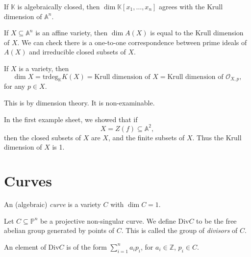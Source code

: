 \documentclass[12pt]{article}
\begin{document}

\begin{remark}
	If $\mathbb{K}$ is algebraically closed, then $\dim \mathbb{K}[x_1, \ldots, x_n]$ agrees with the Krull dimension of $\mathbb{A}^n$.

	If $X \subseteq \mathbb{A}^n$ is an affine variety, then $\dim A(X)$ is equal to the Krull dimension of $X$. We can check there is a one-to-one correspondence between prime ideals of $A(X)$ and irreducible closed subsets of $X$.
\end{remark}

\begin{theorem}
	If $X$ is a variety, then
	\[
		\dim X = \mathrm{trdeg}_{\mathbb{K}} K(X) = \text{Krull dimension of } X = \text{Krull dimension of } \mathcal{O}_{X, p},
	\]
	for any $p \in X$.
\end{theorem}

\begin{proofbox}
	This is by dimension theory. It is non-examinable.
\end{proofbox}

\begin{exbox}
	In the first example sheet, we showed that if
	\[
	X = Z(f) \subseteq \mathbb{A}^2,
	\]
	then the closed subsets of $X$ are $X$, and the finite subsets of $X$. Thus the Krull dimension of $X$ is 1.
\end{exbox}

\newpage

\section{Curves}
\label{sec:c}

\begin{definition}
	An (algebraic) \emph{curve} is a variety $C$ with $\dim C = 1$.
\end{definition}

\begin{definition}
	Let $C \subseteq \mathbb{P}^n$ be a projective non-singular curve. We define $\mathrm{Div} C$ to be the free abelian group generated by points of $C$. This is called the group of \emph{divisors} of $C$.

	An element of $\mathrm{Div} C$ is of the form $\sum_{i= 1}^n a_i p_i$, for $a_i \in \mathbb{Z}$, $p_i \in C$.
\end{definition}
\end{document}
